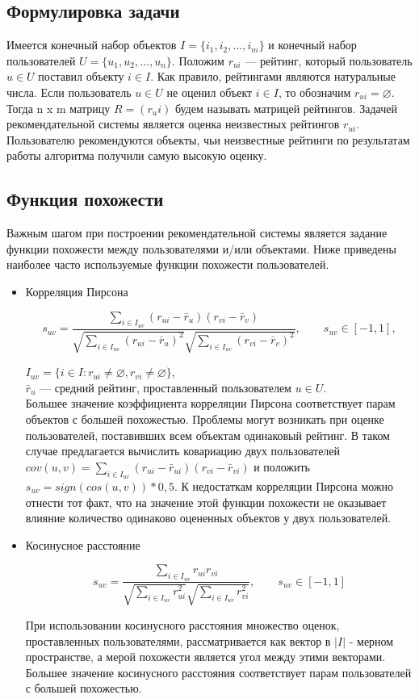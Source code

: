 \documentclass[a4paper, 12pt]{article} %
\begin{document}
\subsection{Формулировка задачи}
Имеется конечный набор объектов $I=\{i_{1}, i_{2}, \dots, i_{m}\}$ и конечный набор пользователей $U=\{u_{1}, u_{2}, \dots, u_{n}\}$.
Положим $r_{ui}$ --- рейтинг, который пользователь $u\in U$ поставил объекту $i\in I$. Как правило, рейтингами являются натуральные числа. Если пользователь $u \in U$ не оценил объект $i \in I$, то обозначим $r_{ui} = \varnothing$. Тогда n x m матрицу  $R = (r_ui) $ будем называть матрицей рейтингов. Задачей рекомендательной системы является оценка неизвестных рейтингов $r_{ui}$. Пользователю рекомендуются объекты, чьи неизвестные рейтинги по результатам работы алгоритма получили самую высокую оценку.


\subsection{Функция похожести}
Важным шагом при построении рекомендательной системы является задание функции похожести между пользователями и/или объектами. Ниже приведены наиболее часто используемые функции похожести пользователей.
\begin{itemize}

\item{Корреляция Пирсона\cite{grouplens}}

\[
s_{uv} = \frac{\sum_{i \in I_{uv}} (r_{ui} - \bar{r}_{u})(r_{vi} - \bar{r}_{v})}{\sqrt{\sum_{i \in I_{uv}}  (r_{ui} - \bar{r}_{u})^2} \sqrt{\sum_{i \in I_{uv}}  (r_{vi} - \bar{r}_{v})^2}},\qquad s_{uv} \in [-1, 1],
\]

$I_{uv} = \{i \in I: r_{ui} \neq  \varnothing, r_{vi} \neq \varnothing\}$, 
\\
$\bar{r}_{u}$ --- средний рейтинг, проставленный пользователем $u \in U$. 
\\ 
Большее значение коэффициента корреляции Пирсона соответствует парам объектов с большей похожестью. Проблемы могут возникать при оценке пользователей, поставивших всем объектам одинаковый рейтинг. В таком случае предлагается вычислить ковариацию двух пользователей\\ $cov(u, v) = \sum_{i \in I_{uv}} (r_{ui} - \bar{r}_{ui})(r_{vi} - \bar{r}_{vi})$ и положить $s_{uv}=sign(cos(u,v)) * 0,5$. К недостаткам корреляции Пирсона можно отнести тот факт, что на значение этой функции похожести не оказывает влияние количество одинаково оцененных объектов у двух пользователей.


\item{Косинусное расстояние}

\[
s_{uv} = \frac{\sum_{i \in I_{uv}} r_{ui}r_{vi}} {\sqrt{\sum_{i \in I_{uv}} r_{ui}^2} \sqrt{\sum_{i \in I_{uv}} r_{vi}^2}},\qquad s_{uv} \in [-1, 1] 
\]

При использовании косинусного расстояния множество оценок, проставленных пользователями, рассматривается как вектор в $|I|$ - мерном пространстве, а мерой похожести является угол между этими векторами. Большее значение косинусного расстояния соответствует парам пользователей с большей похожестью. 
\end{itemize}
\end{document}
